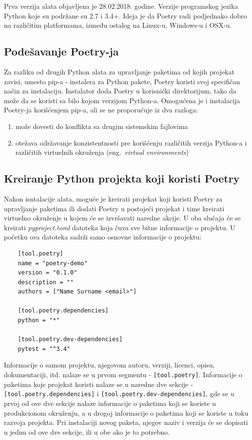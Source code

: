 \documentclass[12pt]{report}
\begin{document}
Prva verzija alata objavljena je 28.02.2018. godine. Verzije programskog jezika Python koje su podržane su 2.7 i 3.4+. Ideja je da Poetry radi podjednako dobro na različitim platformama, između ostalog na Linux-u, Windows-u i OSX-u.

\subsection{Podešavanje Poetry-ja}
Za razliku od drugih Python alata za upravljanje paketima od kojih projekat zavisi, umesto pip-a - instalera za Python pakete, Poetry koristi svoj specifičan način za instalaciju. Instalator doda Poetry u korisnički direktorijum, tako da može da se koristi sa bilo kojom verzijom Python-a. Omogućena je i instalacija Poetry-ja korišćenjem pip-a, ali se ne proporučuje iz dva razloga:

\begin{enumerate}
    \item može dovesti do konflikta sa drugim sistemskim fajlovima
    \item otežava održavanje konzistentnosti pre korišćenju različitih verzija Python-a i različitih virtuelnih okruženja (eng.\ \textit{virtual environments})
\end{enumerate}

\subsection{Kreiranje Python projekta koji koristi Poetry}
Nakon isntalacije alata, moguće je kreirati projekat koji koristi Poetry za upravljanje paketima ili dodati Poetry u postojeći projekat i time kreirati virtuelno okruženje u kojem će se izvršavati naredne akcije. U oba slučaja će se kreirati \textit{pyproject.toml} datoteka koja čuva sve bitne informacije o projektu. U početku ova datoteka sadrži samo osnovne informacije o projektu:

\begin{samepage}
    \begin{verbatim}
    [tool.poetry]
    name = "poetry-demo"
    version = "0.1.0"
    description = ""
    authors = ["Name Surname <email>"]

    [tool.poetry.dependencies]
    python = "*"

    [tool.poetry.dev-dependencies]
    pytest = "^3.4"
    \end{verbatim}
\end{samepage}

Informacije o samom projektu, njegovom autoru, verziji, licenci, opisu, dokumentaciji, itd. nalaze se u prvom segmentu - \texttt{[tool.poetry]}. Informacije o paketima koje projekat koristi nalaze se u naredne dve sekcije - \texttt{[tool.poetry.dependencies]} i \texttt{[tool.poetry.dev-dependencies]}, gde se u prvoj od ove dve sekcije nalaze informacije o paketima koji se koriste u produkcionom okruženju, a u drogoj informacije o paketima koji se koriste u toku razvoja projekta. Pri instalaciji novog paketa, njegov naziv i verzija će se dopisati u jednu od ove dve sekcije, ili u obe ako je to potrebno.
\end{document}
